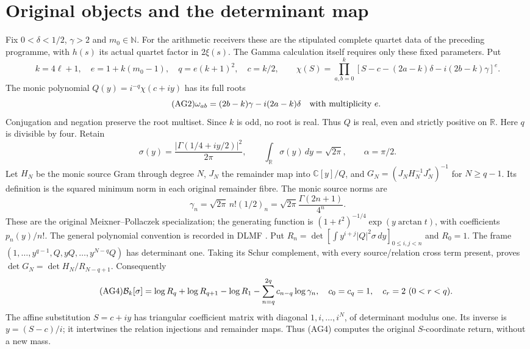 \documentclass[11pt]{article}
\newcommand{\R}{\mathbb R}\newcommand{\C}{\mathbb C}
\newcommand{\dd}{\,d}\newcommand{\Gram}{\operatorname{Gram}}
\begin{document}
\section{Original objects and the determinant map}
Fix $0<\delta<1/2$, $\gamma>2$ and $m_0\in\mathbb N$. For the arithmetic
receivers these are the stipulated complete quartet data of the preceding
programme, with $h(s)$ its actual quartet factor in $2\xi(s)$.
The Gamma calculation itself requires only these fixed parameters. Put
\begin{equation}\tag{AG1}
 k=4\ell+1,\quad e=1+k(m_0-1),\quad q=e(k+1)^2,\quad c=k/2,
 \qquad
 \chi(S)=\prod_{a,b=0}^k
 [S-c-(2a-k)\delta-i(2b-k)\gamma]^e.
\end{equation}
The monic polynomial $Q(y)=i^{-q}\chi(c+iy)$ has its full roots
\begin{equation}\tag{AG2}
 \omega_{ab}=(2b-k)\gamma-i(2a-k)\delta
 \quad\hbox{with multiplicity }e.
\end{equation}
Conjugation and negation preserve the root multiset. Since $k$ is odd,
no root is real. Thus $Q$ is real, even and strictly positive on $\R$.
Here $q$ is divisible by four. Retain
\[
 \sigma(y)=\frac{|\Gamma(1/4+iy/2)|^2}{2\pi},\qquad
 \int_\R\sigma(y)\dd y=\sqrt{2\pi},\qquad \alpha=\pi/2.
\]
Let $H_N$ be the monic source Gram through degree $N$, $J_N$ the remainder
map into $\C[y]/Q$, and $G_N=(J_NH_N^{-1}J_N^*)^{-1}$ for $N\ge q-1$.
Its definition is the squared minimum norm in each original remainder fibre.
The monic source norms are
\begin{equation}\tag{AG3}
 \gamma_n=\sqrt{2\pi}\,n!(1/2)_n
 =\sqrt{2\pi}\frac{\Gamma(2n+1)}{4^n}.
\end{equation}
These are the original Meixner--Pollaczek specialization; the generating
function is $(1+t^2)^{-1/4}\exp(y\arctan t)$, with coefficients $p_n(y)/n!$.
The general polynomial convention is recorded in DLMF \cite{DLMF}.
Put $R_n=\det[\int y^{i+j}|Q|^2\sigma\dd y]_{0\le i,j<n}$ and $R_0=1$.
The frame $(1,\ldots,y^{q-1},Q,yQ,\ldots,y^{N-q}Q)$ has determinant one.
Taking its Schur complement, with every source/relation cross term present,
proves $\det G_N=\det H_N/R_{N-q+1}$. Consequently
\begin{equation}\tag{AG4}
 \mathcal B_k[\sigma]=\log R_q+\log R_{q+1}-\log R_1
       -\sum_{n=q}^{2q}c_{n-q}\log\gamma_n,
 \quad c_0=c_q=1,\quad c_r=2\ (0<r<q).
\end{equation}
The affine substitution $S=c+iy$ has triangular coefficient matrix with
diagonal $1,i,\ldots,i^N$, of determinant modulus one. Its inverse is
$y=(S-c)/i$; it intertwines the relation injections and remainder maps.
Thus (AG4) computes the original $S$-coordinate return, without a new mass.
\end{document}

